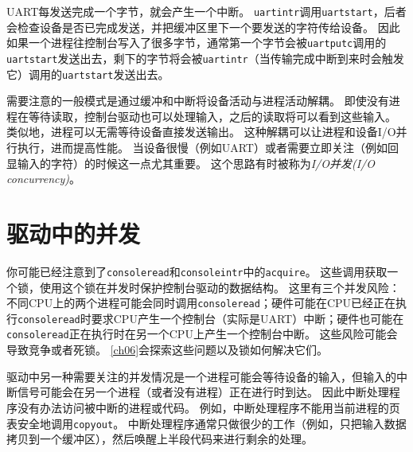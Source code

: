 UART每发送完成一个字节，就会产生一个中断。
\texttt{uartintr}调用\texttt{uartstart}，后者会检查设备是否已完成发送，并把缓冲区里下一个要发送的字符传给设备。
因此如果一个进程往控制台写入了很多字节，通常第一个字节会被\texttt{uartputc}调用的\texttt{uartstart}发送出去，剩下的字节将会被\texttt{uartintr}（当传输完成中断到来时会触发它）调用的\texttt{uartstart}发送出去。

需要注意的一般模式是通过缓冲和中断将设备活动与进程活动解耦。
即使没有进程在等待读取，控制台驱动也可以处理输入，之后的读取将可以看到这些输入。
类似地，进程可以无需等待设备直接发送输出。
这种解耦可以让进程和设备I/O并行执行，进而提高性能。
当设备很慢（例如UART）或者需要立即关注（例如回显输入的字符）的时候这一点尤其重要。
这个思路有时被称为\emph{I/O并发(I/O concurrency)}。

\section{驱动中的并发}
你可能已经注意到了\texttt{consoleread}和\texttt{consoleintr}中的\texttt{acquire}。
这些调用获取一个锁，使用这个锁在并发时保护控制台驱动的数据结构。
这里有三个并发风险：不同CPU上的两个进程可能会同时调用\texttt{consoleread}；硬件可能在CPU已经正在执行\texttt{consoleread}时要求CPU产生一个控制台（实际是UART）中断；硬件也可能在\texttt{consoleread}正在执行时在另一个CPU上产生一个控制台中断。
这些风险可能会导致竞争或者死锁。
\autoref{ch06}会探索这些问题以及锁如何解决它们。

驱动中另一种需要关注的并发情况是一个进程可能会等待设备的输入，但输入的中断信号可能会在另一个进程（或者没有进程）正在进行时到达。
因此中断处理程序没有办法访问被中断的进程或代码。
例如，中断处理程序不能用当前进程的页表安全地调用\texttt{copyout}。
中断处理程序通常只做很少的工作（例如，只把输入数据拷贝到一个缓冲区），然后唤醒上半段代码来进行剩余的处理。

